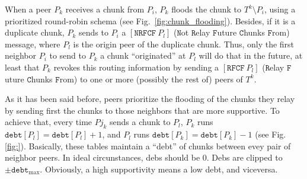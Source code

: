 \label{sec:chunk_flooding}
When a peer $P_k$ receives a chunk from $P_i$, $P_k$ floods the
chunk to $T^k \setminus P_i$, using a prioritized round-robin
schema (see Fig.~\ref{fig:chunk_flooding}). Besides, if
it is a duplicate chunk, $P_k$ sends to $P_i$ a
$[\mathtt{NRFCF}~P_l]$ ($\mathtt{N}$ot $\mathtt{R}$elay
$\mathtt{F}$uture $\mathtt{C}$hunks $\mathtt{F}$rom) message, where
$P_l$ is the origin peer of the duplicate chunk. Thus, only
the first neighbor $P_i$ to send to $P_k$ a chunk
``originated'' at $P_l$ will do that in the future, at least
that $P_k$ revokes this routing information by sending a
$[\mathtt{RFCF}~P_l]$ ($\mathtt{R}$elay $\mathtt{F}$uture
$\mathtt{C}$hunks $\mathtt{F}$rom) to one or more (possibly the rest
of) peers of $T^k$.

As it has been said before, peers prioritize the flooding of the
chunks they relay by sending first the chunks to those neighbors that
are more supportive. To achieve that, every time $Pj_k$ sends a chunk
to $P_l$, $P_k$ runs $\mathtt{debt}[P_l] = \mathtt{debt}[P_l]+1$, and
$P_l$ runs $\mathtt{debt}[P_k] = \mathtt{debt}[P_k]-1$ (see
Fig.\ref{fig:}). Basically, these tables maintain a ``debt'' of chunks
between evey pair of neighbor peers. In ideal circunstances, debs
should be $0$. Debs are clipped to
$\pm\mathtt{debt}_{\text{max}}$. Obviously, a high supportivity means
a low debt, and viceversa.

\begin{comment}
In each round, peers check if a chunk have been received from the rest
of peers of the team (${\cal P}_k\in {\cal T}_j)$). If not, peers send
a $[\mathtt{propagate}~{\cal P}_i]$ to one or more (possibly
to the rest of) peers of the team, where ${\cal P}_i$ is the origin peer
of the missing chunk. At this point, the process continues as
described in Section~\ref{dbs:chunk_flooding}.
\end{comment}

\begin{comment}
For each ${\cal P}_k\in N({\cal P}_i)$, ${\cal P}_i$ checks if a chunk
has been received from ${\cal P}_k$. If ${\cal P}_i$ detects that
${\cal P}_k$ has not sent a chunk to it during $L$ consecutive rounds,
performs $N({\cal P}_i) = N({\cal P}_i)\setminus{\cal P}_k$, and stops
sending to ${\cal P}_k$ more chunks.
\end{comment}
\begin{comment}
computes a
``chunk-debt'', denoted by $d({\cal P}_k)$, that is incremented each
time a chunk is received from ${\cal P}_k$ and decremented each time a
chunk is sent to ${\cal P}_k$. If ${\cal P}_i$ verifies that $d({\cal
  P}_k)>D$ (the maximum debt), then ${\cal P}_i$ considers that ${\cal
  P}_k$ is unable to communicate with it, performs $N({\cal P}_i) =
N({\cal P}_i)\setminus{\cal P}_k$, and stops sending to ${\cal P}_k$
more chunks.
\end{comment}


